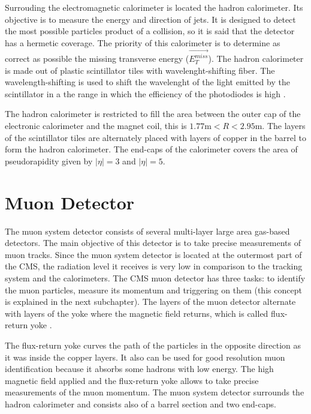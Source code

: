 Surrouding the electromagnetic calorimeter is located the hadron calorimeter. Its objective is to measure the energy and direction of jets. It is designed to detect the most possible particles product of a collision, so it is said that the detector has a hermetic coverage. The priority of this calorimeter is to determine as correct as possible the missing transverse energy ($\vec{E_T^{miss}}$). The hadron calorimeter is made out of plastic scintillator tiles with wavelenght-shifting fiber. The wavelength-shifting is used to shift the wavelenght of the light emitted by the scintillator in a the range in which the efficiency of the photodiodes is high \cite{Perspectives_LHC}.

The hadron calorimeter is restricted to fill the area between the outer cap of the electronic calorimeter and the magnet coil, this is $1.77 \text{m} < R < 2.95\text{m}$. The layers of the scintillator tiles are alternately placed with layers of copper in the barrel to form the hadron calorimeter. The end-caps of the calorimeter covers the area of pseudorapidity given by $|\eta|= 3$ and $|\eta|= 5$.


\section{Muon Detector}

The muon system detector consists of several multi-layer large area gas-based detectors. The main objective of this detector is to take precise measurements of muon tracks. Since the muon system 
detector is located at the outermost part of the CMS, the radiation level it receives is very low in comparison to the tracking system and the calorimeters. The CMS muon detector has three tasks: 
to identify the muon particles, measure its momentum and triggering on them (this concept is explained in the next subchapter). The layers of the muon detector alternate with layers of the yoke where 
the magnetic field returns, which is called flux-return yoke \cite{Perspectives_LHC}. 

The flux-return yoke curves the path of the particles in the opposite direction as it was inside the copper layers. It also can be used for good resolution muon identification because it absorbs 
some hadrons with low energy. The high magnetic field applied and the flux-return yoke allows to take precise measurements of the muon momentum. The muon system detector surrounds the hadron
calorimeter and consists also of a barrel section and two end-caps. 

